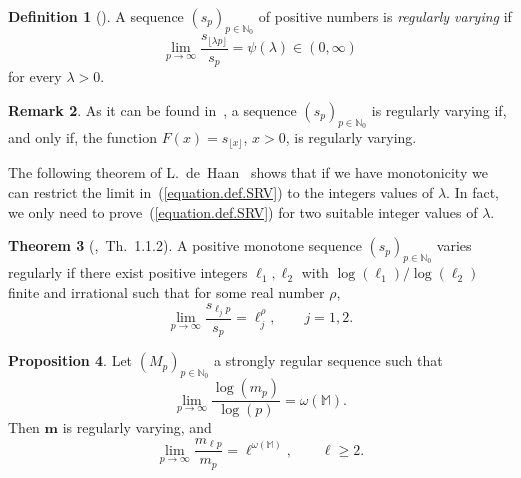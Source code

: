 \documentclass[11pt,a4paper]{article}
\theoremstyle{definition}
\newtheorem{theo}{Theorem}[section]
\newtheorem{pro}[theo]{Proposition}
\newtheorem{defi}[theo]{Definition}
\newtheorem{rema}[theo]{Remark}
\newenvironment{prop}{\smallskip\begin{pro}}{\end{pro}\smallskip}
\newenvironment{den}{\smallskip\begin{defi}}{\end{defi}\smallskip}
\def\oo{\infty}
\def\ri{\rightarrow}
\def\o{\omega}
\def\ro{\rho}
\def\N{\mathbb{N}}
\def\M{\mathbb{M}}
\def\m{\boldsymbol{m}}
\begin{document}
\begin{den}[\cite{BojanicSeneta}]
A sequence $(s_p)_{p\in\N_0}$ of positive numbers is \textit{regularly varying} if
\begin{equation}\label{equation.def.SRV}
\lim_{p\ri\oo} \frac{ s_{\lfloor \lambda p\rfloor}}{s_p}=\psi(\lambda) \in (0,\oo)
\end{equation}
 for every $\lambda>0.$
\end{den}

\begin{rema}\label{remaEquivRegurVariationFunctionSequence}
As it can be found in~\cite[Th.\ 2]{BojanicSeneta}, a sequence $(s_p)_{p\in\N_0}$ is regularly varying if, and only if, the function $F(x)=s_{\lfloor x\rfloor}$, $x>0$, is regularly varying.
\end{rema}

The following theorem of L.~de~Haan~\cite{haan} shows that if we have monotonicity
we can restrict the limit in~(\ref{equation.def.SRV}) to the integers values of $\lambda$. In fact, we only need to prove~(\ref{equation.def.SRV}) for two suitable integer values of $\lambda$.

\begin{theo}[\cite{haan},\ Th.\ 1.1.2] A positive monotone sequence $(s_p)_{p\in\N_0}$ varies regularly if there exist
positive integers $\ell_1,\ell_2$ with $\log(\ell_1)/\log(\ell_2)$ finite and irrational such that for some real number $\ro$,
$$\lim_{p\ri\oo} \frac{s_{\ell_j p}}{s_p}=\ell_j^{\ro}, \qquad j=1,2.$$
\end{theo}


\begin{prop}\label{pro.SRS.implica.RV}
 Let $(M_p)_{p\in\N_0}$ a strongly regular sequence such that
 $$\lim_{p\ri\oo} \frac{\log(m_p)}{\log(p)}=\o(\M).$$
Then $\m$ is regularly varying, and
 $$\lim_{p\ri\oo} \frac{m_{\ell p}}{m_p}=\ell^{\o(\M)}, \qquad \ell\geq 2.$$
\end{prop}
\end{document}
